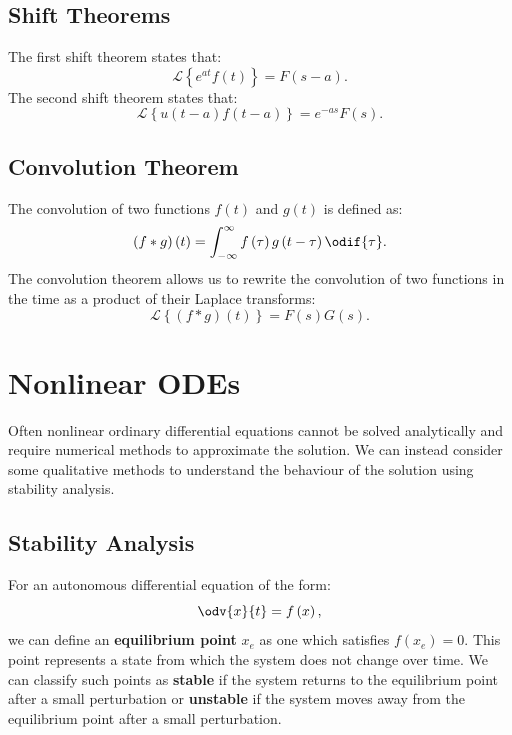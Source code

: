 \documentclass{article}
\begin{document}
\subsection{Shift Theorems}
The first shift theorem states that:
\begin{equation*}
    \mathscr{L}\left\{ e^{at} f\left( t \right) \right\} = F\left( s - a \right).
\end{equation*}
The second shift theorem states that:
\begin{equation*}
    \mathscr{L}\left\{ u\left( t - a \right) f\left( t - a \right) \right\} = e^{-as} F\left( s \right).
\end{equation*}
\subsection{Convolution Theorem}
The convolution of two functions \(f\left( t \right)\) and \(g\left( t
\right)\) is defined as:
\begin{equation*}
    \left( f * g \right)\left( t \right) = \int_{-\infty}^\infty f\left( \tau \right) g\left( t - \tau \right) \odif{\tau}.
\end{equation*}
The convolution theorem allows us to rewrite the convolution of two
functions in the time as a product of their Laplace transforms:
\begin{equation*}
    \mathscr{L}\left\{ \left( f * g \right)\left( t \right) \right\} = F\left( s \right) G\left( s \right).
\end{equation*}
\section{Nonlinear ODEs}
Often nonlinear ordinary differential equations cannot be solved
analytically and require numerical methods to approximate the solution.
We can instead consider some qualitative methods to understand the
behaviour of the solution using stability analysis.
\subsection{Stability Analysis}
For an autonomous differential equation of the form:
\begin{equation*}
    \odv{x}{t} = f\left( x \right),
\end{equation*}
we can define an \textbf{equilibrium point} \(x_e\) as one which
satisfies \(f\left( x_e \right) = 0\). This point represents a
state from which the system does not change over time. We can classify
such points as \textbf{stable} if the system returns to the equilibrium
point after a small perturbation or \textbf{unstable} if the system
moves away from the equilibrium point after a small perturbation.
\end{document}
